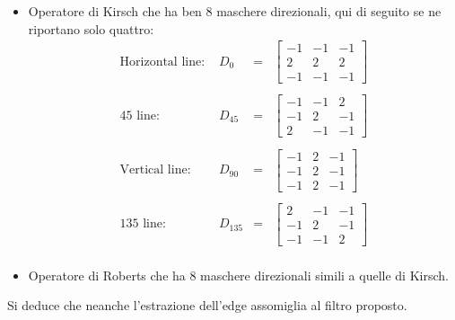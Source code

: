 \documentclass[a4paper]{article}
\begin{document}
\begin{itemize}
		\item Operatore di Kirsch che ha ben 8 maschere direzionali, qui di seguito se ne riportano solo quattro:
		\begin{equation*}
			\begin{array}{lllc}
				\text{Horizontal line: } & D_{0} & = & \begin{bmatrix}
					-1 & -1  & -1 \\
					2 & 2 & 2 \\
					-1 & -1 & -1
				\end{bmatrix} \\
				&&& \\
				45\text{ line: } & D_{45} & = & \begin{bmatrix}
					-1 & -1  & 2 \\
					-1 & 2 & -1 \\
					2 & -1 & -1
				\end{bmatrix} \\
				&&& \\
				\text{Vertical line: } & D_{90} & = & \begin{bmatrix}
					-1 & 2  & -1 \\
					-1 & 2 & -1 \\
					-1 & 2 & -1
				\end{bmatrix} \\
				&&& \\
				135\text{ line: } & D_{135} & = & \begin{bmatrix}
					2 & -1  & -1 \\
					-1 & 2 & -1 \\
					-1 & -1 & 2
				\end{bmatrix} \\
			\end{array}
		\end{equation*}
	
		\item Operatore di Roberts che ha 8 maschere direzionali simili a quelle di Kirsch.
	\end{itemize}
	Si deduce che neanche l'estrazione dell'edge assomiglia al filtro proposto.\newline
	
\end{document}
